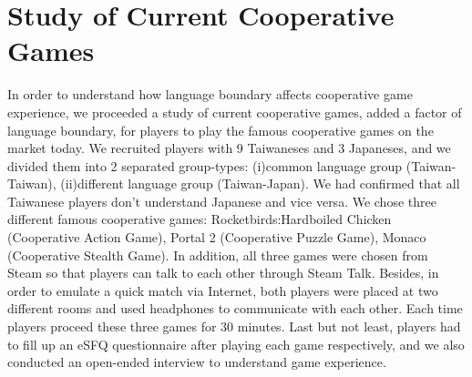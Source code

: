 \section{Study of Current Cooperative Games}


In order to understand how language boundary affects cooperative game experience, we proceeded a study of current cooperative games, added a factor of language boundary, for players to play the famous cooperative games on the market today. We recruited players with 9 Taiwaneses and 3 Japaneses, and we divided them into 2 separated group-types: (i)common language group (Taiwan-Taiwan), (ii)different language group (Taiwan-Japan). We had confirmed that all Taiwanese players don't understand Japanese and vice versa. We chose three different famous cooperative games: Rocketbirds:Hardboiled Chicken (Cooperative Action Game), Portal 2 (Cooperative Puzzle Game), Monaco (Cooperative Stealth Game). In addition, all three games were chosen from Steam so that players can talk to each other through Steam Talk. Besides, in order to emulate a quick match via Internet, both players were placed at two different rooms and used headphones to communicate with each other. Each time players proceed these three games for 30 minutes. Last but not least, players had to fill up an eSFQ\cite{eSFQ} questionnaire after playing each game respectively, and we also conducted an open-ended interview to understand game experience. 

